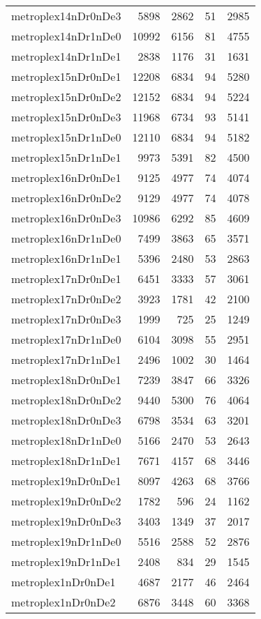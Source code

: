 \begin{longtable}{lrrrr}
metroplex14nDr0nDe3 & 5898 & 2862 & 51 & 2985 \\
metroplex14nDr1nDe0 & 10992 & 6156 & 81 & 4755 \\
metroplex14nDr1nDe1 & 2838 & 1176 & 31 & 1631 \\
metroplex15nDr0nDe1 & 12208 & 6834 & 94 & 5280 \\
metroplex15nDr0nDe2 & 12152 & 6834 & 94 & 5224 \\
metroplex15nDr0nDe3 & 11968 & 6734 & 93 & 5141 \\
metroplex15nDr1nDe0 & 12110 & 6834 & 94 & 5182 \\
metroplex15nDr1nDe1 & 9973 & 5391 & 82 & 4500 \\
metroplex16nDr0nDe1 & 9125 & 4977 & 74 & 4074 \\
metroplex16nDr0nDe2 & 9129 & 4977 & 74 & 4078 \\
metroplex16nDr0nDe3 & 10986 & 6292 & 85 & 4609 \\
metroplex16nDr1nDe0 & 7499 & 3863 & 65 & 3571 \\
metroplex16nDr1nDe1 & 5396 & 2480 & 53 & 2863 \\
metroplex17nDr0nDe1 & 6451 & 3333 & 57 & 3061 \\
metroplex17nDr0nDe2 & 3923 & 1781 & 42 & 2100 \\
metroplex17nDr0nDe3 & 1999 & 725 & 25 & 1249 \\
metroplex17nDr1nDe0 & 6104 & 3098 & 55 & 2951 \\
metroplex17nDr1nDe1 & 2496 & 1002 & 30 & 1464 \\
metroplex18nDr0nDe1 & 7239 & 3847 & 66 & 3326 \\
metroplex18nDr0nDe2 & 9440 & 5300 & 76 & 4064 \\
metroplex18nDr0nDe3 & 6798 & 3534 & 63 & 3201 \\
metroplex18nDr1nDe0 & 5166 & 2470 & 53 & 2643 \\
metroplex18nDr1nDe1 & 7671 & 4157 & 68 & 3446 \\
metroplex19nDr0nDe1 & 8097 & 4263 & 68 & 3766 \\
metroplex19nDr0nDe2 & 1782 & 596 & 24 & 1162 \\
metroplex19nDr0nDe3 & 3403 & 1349 & 37 & 2017 \\
metroplex19nDr1nDe0 & 5516 & 2588 & 52 & 2876 \\
metroplex19nDr1nDe1 & 2408 & 834 & 29 & 1545 \\
metroplex1nDr0nDe1 & 4687 & 2177 & 46 & 2464 \\
metroplex1nDr0nDe2 & 6876 & 3448 & 60 & 3368 \\

\end{longtable}
